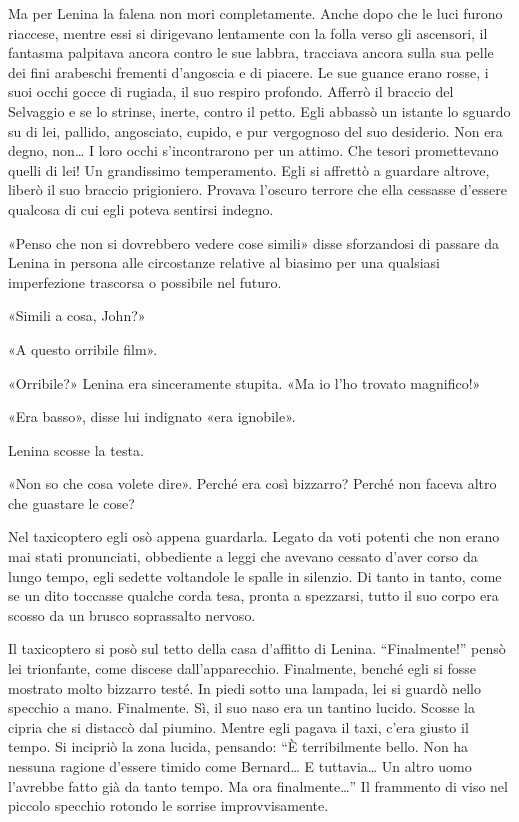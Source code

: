 \documentclass[
a5paper, %
10pt, %
twoside, 
onecolumn, %
openany, %
]{memoir}
\begin{document}
Ma per Lenina la falena non mori completamente. Anche dopo che le luci furono riaccese, mentre essi si dirigevano lentamente con la folla verso gli ascensori, il fantasma palpitava ancora contro le sue labbra, tracciava ancora sulla sua pelle dei fini arabeschi frementi d’angoscia e di piacere. Le sue guance erano rosse, i suoi occhi gocce di rugiada, il suo respiro profondo. Afferrò il braccio del Selvaggio e se lo strinse, inerte, contro il petto. Egli abbassò un istante lo sguardo su di lei, pallido, angosciato, cupido, e pur vergognoso del suo desiderio. Non era degno, non… I loro occhi s’incontrarono per un attimo. Che tesori promettevano quelli di lei! Un grandissimo temperamento. Egli si affrettò a guardare altrove, liberò il suo braccio prigioniero. Provava l’oscuro terrore che ella cessasse d’essere qualcosa di cui egli poteva sentirsi indegno.

«Penso che non si dovrebbero vedere cose simili» disse sforzandosi di passare da Lenina in persona alle circostanze relative al biasimo per una qualsiasi imperfezione trascorsa o possibile nel futuro.

«Simili a cosa, John?»

«A questo orribile film».

«Orribile?» Lenina era sinceramente stupita. «Ma io l’ho trovato magnifico!»

«Era basso», disse lui indignato «era ignobile».

Lenina scosse la testa.

«Non so che cosa volete dire». Perché era così bizzarro? Perché non faceva altro che guastare le cose?

Nel taxicoptero egli osò appena guardarla. Legato da voti potenti che non erano mai stati pronunciati, obbediente a leggi che avevano cessato d’aver corso da lungo tempo, egli sedette voltandole le spalle in silenzio. Di tanto in tanto, come se un dito toccasse qualche corda tesa, pronta a spezzarsi, tutto il suo corpo era scosso da un brusco soprassalto nervoso.

Il taxicoptero si posò sul tetto della casa d’affitto di Lenina. “Finalmente!” pensò lei trionfante, come discese dall’apparecchio. Finalmente, benché egli si fosse mostrato molto bizzarro testé. In piedi sotto una lampada, lei si guardò nello specchio a mano. Finalmente. Sì, il suo naso era un tantino lucido. Scosse la cipria che si distaccò dal piumino. Mentre egli pagava il taxi, c’era giusto il tempo. Si incipriò la zona lucida, pensando: “È terribilmente bello. Non ha nessuna ragione d’essere timido come Bernard… E tuttavia… Un altro uomo l’avrebbe fatto già da tanto tempo. Ma ora finalmente…” Il frammento di viso nel piccolo specchio rotondo le sorrise improvvisamente.
\end{document}

